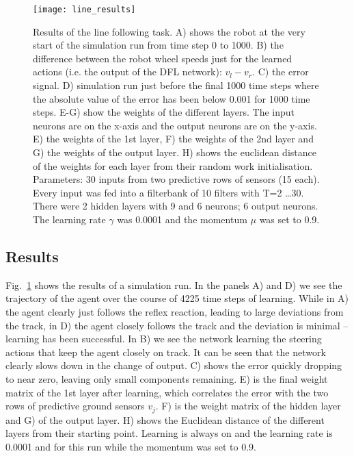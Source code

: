 \documentclass{aamas2018}
\begin{document}
\begin{figure}[!ht]
  \centering
  \texttt{[image: line\_results]}
  \caption{Results of the line following task. A) shows the robot at
    the very start of the simulation run from time step 0 to 1000. B)
    the difference between the robot wheel speeds just for the learned
    actions (i.e. the output of the DFL network): $v_l-v_r$.  C) the
    error signal.  D) simulation run just before the final 1000 time
    steps where the absolute value of the error has been below 0.001
    for 1000 time steps. E-G) show the weights of the different
    layers. The input neurons are on the x-axis and the output neurons
    are on the y-axis.  E) the weights of the 1st layer, F) the
    weights of the 2nd layer and G) the weights of the output layer.
    H) shows the euclidean distance of the weights for each layer from
    their random work initialisation. Parameters: 30 inputs from two
    predictive rows of sensors (15 each). Every input was fed into a
    filterbank of 10 filters with T=2 \ldots 30. There were 2 hidden
    layers with 9 and 6 neurons; 6 output neurons. The learning rate $\gamma$
    was 0.0001 and the momentum $\mu$ was set to 0.9.
    \label{line_results}}
\end{figure}



\subsection{Results}
Fig.~\ref{line_results} shows the results of a simulation run. In the
panels A) and D) we see the trajectory of the agent over the course of
4225 time steps of learning. While in A) the agent clearly just
follows the reflex reaction, leading to large deviations from the
track, in D) the agent closely follows the track and the deviation is
minimal -- learning has been successful. In B) we see the network
learning the steering actions that keep the agent closely on track.
It can be seen that the network clearly slows down in the change of
output.  C) shows the error quickly dropping to near zero, leaving
only small components remaining. E) is the final weight matrix of the
1st layer after learning, which correlates the error with the two rows
of predictive ground sensors $v_j$. F) is the weight matrix of the
hidden layer and G) of the output layer. H) shows the Euclidean
distance of the different layers from their starting point. Learning
is always on and the learning rate is 0.0001 and for this run while
the momentum was set to 0.9.
\end{document}
